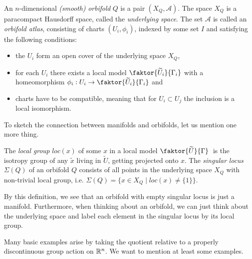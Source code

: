 \begin{definition}
    An \(n\)-dimensional \emph{(smooth) orbifold} \(Q\) is a pair \((X_Q, \mathcal{A})\).
    The space \(X_Q\) is a paracompact Hausdorff space, called the \emph{underlying space}.
    The set \(\mathcal{A}\) is called an \emph{orbifold atlas}, consisting of charts \((U_i, \phi_i)\), indexed by some set \(I\) and satisfying the following conditions:
    \begin{itemize}
        \item the \(U_i\) form an open cover of the underlying space \(X_Q\),\vspace*{-.7em}
        \item for each \(U_i\) there exists a local model \(\faktor{\widetilde{U}_i}{\Gamma_i}\) with a homeomorphism \(\phi_i : U_i \to \faktor{\widetilde{U}_i}{\Gamma_i}\) and
        \item charts have to be compatible, meaning that for \(U_i \subset U_j\) the inclusion is a local isomorphism.
    \end{itemize}
\end{definition}

To sketch the connection between manifolds and orbifolds, let us mention one more thing.

\begin{definition}
    The \emph{local group} \(loc(x)\) of some \(x\) in a local model \(\faktor{\widetilde{U}}{\Gamma}\;\) is the isotropy group of any \(\widetilde{x}\) living in \(\widetilde{U}\), getting projected onto \(x\).
    The \emph{singular locus} \(\Sigma (Q)\) of an orbifold \(Q\) consists of all points in the underlying space \(X_Q\) with non-trivial local group, i.e. \(\Sigma(Q) = \{x \in X_Q \;\vert\; loc(x) \neq \{1\}\}\).
\end{definition}

By this definition, we see that an orbifold with empty singular locus is just a manifold.
Furthermore, when thinking about an orbifold, we can just think about the underlying space and label each element in the singular locus by its local group.

\noindent
Many basic examples arise by taking the quotient relative to a properly discontinuous group action on \(\mathbb{R}^n\).
We want to mention at least some examples.

